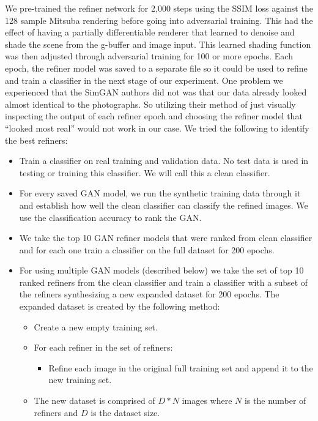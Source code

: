\documentclass[10pt,twocolumn,letterpaper]{article}
\begin{document}
We pre-trained the refiner network for 2,000 steps using the SSIM loss against the 128 sample Mitsuba rendering before going into adversarial training.  This had the effect of having a partially differentiable renderer that learned to denoise and shade the scene from the g-buffer and image input.  This learned shading function was then adjusted through adversarial training for 100 or more epochs.  Each epoch, the refiner model was saved to a separate file so it could be used to refine and train a classifier in the next stage of our experiment.  One problem we experienced that the SimGAN authors did not was that our data already looked almost identical to the photographs. So utilizing their method of just visually inspecting the output of each refiner epoch and choosing the refiner model that ``looked most real'' would not work in our case. We tried the following to identify the best refiners:
\begin{itemize}
\item Train a classifier on real training and validation data.  No test data is used in testing or training this classifier.  We will call this a clean classifier.
\item For every saved GAN model, we run the synthetic training data through it and establish how well the clean classifier can classify the refined images. We use the classification accuracy to rank the GAN.
\item We take the top 10 GAN refiner models that were ranked from clean classifier and for each one train a classifier on the full dataset for 200 epochs.  
\item For using multiple GAN models (described below) we take the set of top 10 ranked refiners from the clean classifier and train a classifier with a subset of the refiners synthesizing a new expanded dataset for 200 epochs. The expanded dataset is created by the following method:
\begin{itemize}
\item Create a new empty training set.
\item For each refiner in the set of refiners:
\begin{itemize}
\item Refine each image in the original full training set and append it to the new training set.
\end{itemize}
\item The new dataset is comprised of $D * N$ images where $N$ is the number of refiners and $D$ is the dataset size.
\end{itemize}
\end{itemize}
\end{document}
